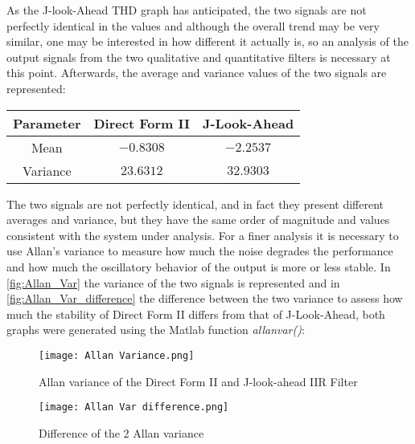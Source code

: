 As the J-look-Ahead {THD} graph has anticipated, the two signals are not perfectly identical in the values and although the overall trend may be very similar, one may be interested in how different it actually is, so an analysis of the output signals from the two qualitative and quantitative filters is necessary at this point. Afterwards, the average and variance values of the two signals are represented:

\begin{table}[H]
	\begin{center}
		\begin{tabular}{|c|c|c|}
			\hline
			Parameter		& Direct Form II	& J-Look-Ahead 			\\ \hline
			Mean			&$-0.8308$  		& $-2.2537$	           	\\ \hline
			Variance		&$23.6312$      	& $32.9303$             \\ \hline
			
		\end{tabular}
	\end{center}
\end{table}

The two signals are not perfectly identical, and in fact they present different averages and variance, but they have the same order of magnitude and values consistent with the system under analysis. For a finer analysis it is necessary to use Allan's variance to measure how much the noise degrades the performance and how much the oscillatory behavior of the output is more or less stable. In \autoref{fig:Allan_Var} the variance of the two signals is represented and in \autoref{fig:Allan_Var_difference} the difference between the two variance to assess how much the stability of Direct Form II differs from that of J-Look-Ahead, both graphs were generated using the Matlab function \textit{allanvar()}:

\begin{figure}[ht]
	\centering
	\begin{minipage}[b]{0.44\linewidth}
		\centering
		\texttt{[image: Allan Variance.png]}
		\caption{Allan variance of the Direct Form II  and J-look-ahead IIR Filter}
		\label{fig:Allan_Var}
	\end{minipage}
	\hspace{0.5cm}
	\begin{minipage}[b]{0.48\linewidth}
		\centering
		\texttt{[image: Allan Var difference.png]}
		\caption{Difference of the 2 Allan variance}
		\label{fig:Allan_Var_difference}
	\end{minipage}
\end{figure}

\pagebreak